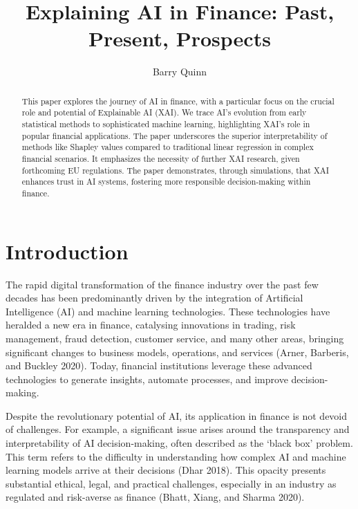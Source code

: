 \documentclass[
  letterpaper,
  DIV=11,
  numbers=noendperiod]{scrartcl}
\title{Explaining AI in Finance: Past, Present, Prospects}
\author{Barry Quinn}
\date{}
\begin{document}
\maketitle
\begin{abstract}
This paper explores the journey of AI in finance, with a particular
focus on the crucial role and potential of Explainable AI (XAI). We
trace AI's evolution from early statistical methods to sophisticated
machine learning, highlighting XAI's role in popular financial
applications. The paper underscores the superior interpretability of
methods like Shapley values compared to traditional linear regression in
complex financial scenarios. It emphasizes the necessity of further XAI
research, given forthcoming EU regulations. The paper demonstrates,
through simulations, that XAI enhances trust in AI systems, fostering
more responsible decision-making within finance.
\end{abstract}
\ifdefined\Shaded\renewenvironment{Shaded}{\begin{tcolorbox}[boxrule=0pt, borderline west={3pt}{0pt}{shadecolor}, interior hidden, breakable, enhanced, sharp corners, frame hidden]}{\end{tcolorbox}}\fi

\hypertarget{introduction}{%
\section{Introduction}\label{introduction}}

The rapid digital transformation of the finance industry over the past
few decades has been predominantly driven by the integration of
Artificial Intelligence (AI) and machine learning technologies. These
technologies have heralded a new era in finance, catalysing innovations
in trading, risk management, fraud detection, customer service, and many
other areas, bringing significant changes to business models,
operations, and services (Arner, Barberis, and Buckley 2020). Today,
financial institutions leverage these advanced technologies to generate
insights, automate processes, and improve decision-making.

Despite the revolutionary potential of AI, its application in finance is
not devoid of challenges. For example, a significant issue arises around
the transparency and interpretability of AI decision-making, often
described as the `black box' problem. This term refers to the difficulty
in understanding how complex AI and machine learning models arrive at
their decisions (Dhar 2018). This opacity presents substantial ethical,
legal, and practical challenges, especially in an industry as regulated
and risk-averse as finance (Bhatt, Xiang, and Sharma 2020).
\end{document}
